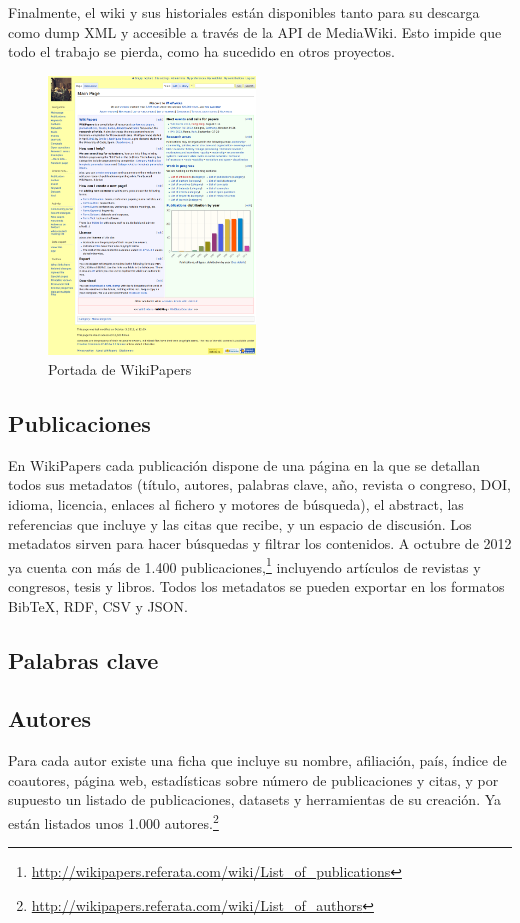 \documentclass[11pt,twocolumn]{article}
\begin{document}
Finalmente, el wiki y sus historiales están disponibles tanto para su descarga como dump XML y accesible a través de la API de MediaWiki. Esto impide que todo el trabajo se pierda, como ha sucedido en otros proyectos.

\begin{figure}[htb]
\centering
\includegraphics[width=0.49\textwidth]{wpfull.png}
\caption{Portada de WikiPapers}
\label{fig:wpfull}
\end{figure}

\subsection{Publicaciones}
En WikiPapers cada publicación dispone de una página en la que se detallan todos sus metadatos (título, autores, palabras clave, año, revista o congreso, DOI, idioma, licencia, enlaces al fichero y motores de búsqueda), el abstract, las referencias que incluye y las citas que recibe, y un espacio de discusión. Los metadatos sirven para hacer búsquedas y filtrar los contenidos. A octubre de 2012 ya cuenta con más de 1.400 publicaciones,\footnote{\href{http://wikipapers.referata.com/wiki/List_of_publications}{http://wikipapers.referata.com/wiki/List\_of\_publications}} incluyendo artículos de revistas y congresos, tesis y libros. Todos los metadatos se pueden exportar en los formatos BibTeX, RDF, CSV y JSON.

\subsection{Palabras clave}

\subsection{Autores}
Para cada autor existe una ficha que incluye su nombre, afiliación, país, índice de coautores, página web, estadísticas sobre número de publicaciones y citas, y por supuesto un listado de publicaciones, datasets y herramientas de su creación. Ya están listados unos 1.000 autores.\footnote{\href{http://wikipapers.referata.com/wiki/List_of_authors}{http://wikipapers.referata.com/wiki/List\_of\_authors}}
\end{document}
